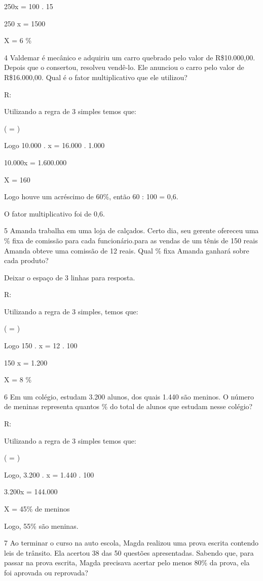 {250x = 100 . 15

250 x = 1500

X = 6 \%

\num{4} Valdemar é mecânico e adquiriu um carro quebrado pelo valor de
R\$10.000,00. Depois que o consertou, resolveu vendê-lo. Ele anunciou o
carro pelo valor de R\$16.000,00. Qual é o fator multiplicativo que ele
utilizou?

R:

Utilizando a regra de 3 simples temos que:

( = )

Logo 10.000 . x = 16.000 . 1.000

10.000x = 1.600.000

X = 160

Logo houve um acréscimo de 60\%, então 60 : 100 = 0,6.

O fator multiplicativo foi de 0,6.

\num{5} Amanda trabalha em uma loja de calçados. Certo dia, seu gerente
ofereceu uma \% fixa de comissão para cada funcionário.para as vendas de
um tênis de 150 reais Amanda obteve uma comissão de 12 reais. Qual \%
fixa Amanda ganhará sobre cada produto?

Deixar o espaço de 3 linhas para resposta.

R:

Utilizando a regra de 3 simples, temos que:

( = )

Logo 150 . x = 12 . 100

150 x = 1.200

X = 8 \%

\num{6} Em um colégio, estudam 3.200 alunos, dos quais 1.440 são meninos. O
número de meninas representa quantos \% do total de alunos que estudam
nesse colégio?

R:

Utilizando a regra de 3 simples temos que:

( = )

Logo, 3.200 . x = 1.440 . 100

3.200x = 144.000

X = 45\% de meninos

Logo, 55\% são meninas.

\num{7} Ao terminar o curso na auto escola, Magda realizou uma prova escrita
contendo leis de trânsito. Ela acertou 38 das 50 questões apresentadas.
Sabendo que, para passar na prova escrita, Magda precisava acertar pelo
menos 80\% da prova, ela foi aprovada ou reprovada?

}
